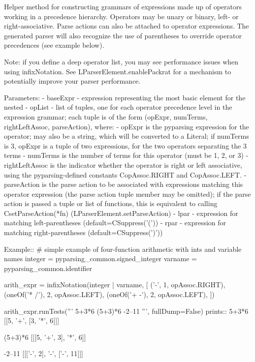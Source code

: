 \begin{DoxyVerb}Helper method for constructing grammars of expressions made up of
operators working in a precedence hierarchy.  Operators may be unary or
binary, left- or right-associative.  Parse actions can also be attached
to operator expressions. The generated parser will also recognize the use 
of parentheses to override operator precedences (see example below).

Note: if you define a deep operator list, you may see performance issues
when using infixNotation. See L{ParserElement.enablePackrat} for a
mechanism to potentially improve your parser performance.

Parameters:
 - baseExpr - expression representing the most basic element for the nested
 - opList - list of tuples, one for each operator precedence level in the
  expression grammar; each tuple is of the form
  (opExpr, numTerms, rightLeftAssoc, parseAction), where:
   - opExpr is the pyparsing expression for the operator;
      may also be a string, which will be converted to a Literal;
      if numTerms is 3, opExpr is a tuple of two expressions, for the
      two operators separating the 3 terms
   - numTerms is the number of terms for this operator (must
      be 1, 2, or 3)
   - rightLeftAssoc is the indicator whether the operator is
      right or left associative, using the pyparsing-defined
      constants C{opAssoc.RIGHT} and C{opAssoc.LEFT}.
   - parseAction is the parse action to be associated with
      expressions matching this operator expression (the
      parse action tuple member may be omitted); if the parse action
      is passed a tuple or list of functions, this is equivalent to
      calling C{setParseAction(*fn)} (L{ParserElement.setParseAction})
 - lpar - expression for matching left-parentheses (default=C{Suppress('(')})
 - rpar - expression for matching right-parentheses (default=C{Suppress(')')})

Example::
    # simple example of four-function arithmetic with ints and variable names
    integer = pyparsing_common.signed_integer
    varname = pyparsing_common.identifier 
    
    arith_expr = infixNotation(integer | varname,
        [
        ('-', 1, opAssoc.RIGHT),
        (oneOf('* /'), 2, opAssoc.LEFT),
        (oneOf('+ -'), 2, opAssoc.LEFT),
        ])
    
    arith_expr.runTests('''
        5+3*6
        (5+3)*6
        -2--11
        ''', fullDump=False)
prints::
    5+3*6
    [[5, '+', [3, '*', 6]]]

    (5+3)*6
    [[[5, '+', 3], '*', 6]]

    -2--11
    [[['-', 2], '-', ['-', 11]]]
\end{DoxyVerb}
 \mbox{\label{namespacesetuptools_1_1__vendor_1_1pyparsing_ad42642ba9455cf9de12294141a2ead3c}} 
